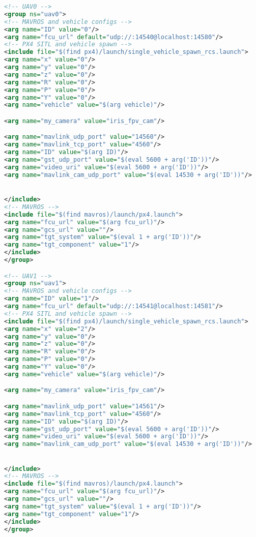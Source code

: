\begin{lstlisting}[language={XML}]
<!-- UAV0 -->
<group ns="uav0">
<!-- MAVROS and vehicle configs -->
<arg name="ID" value="0"/>
<arg name="fcu_url" default="udp://:14540@localhost:14580"/>
<!-- PX4 SITL and vehicle spawn -->
<include file="$(find px4)/launch/single_vehicle_spawn_rcs.launch">
<arg name="x" value="0"/>
<arg name="y" value="0"/>
<arg name="z" value="0"/>
<arg name="R" value="0"/>
<arg name="P" value="0"/>
<arg name="Y" value="0"/>
<arg name="vehicle" value="$(arg vehicle)"/>

<arg name="my_camera" value="iris_fpv_cam"/>

<arg name="mavlink_udp_port" value="14560"/>
<arg name="mavlink_tcp_port" value="4560"/>
<arg name="ID" value="$(arg ID)"/>
<arg name="gst_udp_port" value="$(eval 5600 + arg('ID'))"/>
<arg name="video_uri" value="$(eval 5600 + arg('ID'))"/>
<arg name="mavlink_cam_udp_port" value="$(eval 14530 + arg('ID'))"/>


</include>
<!-- MAVROS -->
<include file="$(find mavros)/launch/px4.launch">
<arg name="fcu_url" value="$(arg fcu_url)"/>
<arg name="gcs_url" value=""/>
<arg name="tgt_system" value="$(eval 1 + arg('ID'))"/>
<arg name="tgt_component" value="1"/>
</include>
</group>

<!-- UAV1 -->
<group ns="uav1">                              
<!-- MAVROS and vehicle configs -->
<arg name="ID" value="1"/>
<arg name="fcu_url" default="udp://:14541@localhost:14581"/>
<!-- PX4 SITL and vehicle spawn -->
<include file="$(find px4)/launch/single_vehicle_spawn_rcs.launch">
<arg name="x" value="2"/>
<arg name="y" value="0"/>
<arg name="z" value="0"/>
<arg name="R" value="0"/>
<arg name="P" value="0"/>
<arg name="Y" value="0"/>
<arg name="vehicle" value="$(arg vehicle)"/>

<arg name="my_camera" value="iris_fpv_cam"/>

<arg name="mavlink_udp_port" value="14561"/>
<arg name="mavlink_tcp_port" value="4560"/>
<arg name="ID" value="$(arg ID)"/>
<arg name="gst_udp_port" value="$(eval 5600 + arg('ID'))"/>
<arg name="video_uri" value="$(eval 5600 + arg('ID'))"/>
<arg name="mavlink_cam_udp_port" value="$(eval 14530 + arg('ID'))"/>


</include>
<!-- MAVROS -->
<include file="$(find mavros)/launch/px4.launch">
<arg name="fcu_url" value="$(arg fcu_url)"/>
<arg name="gcs_url" value=""/>
<arg name="tgt_system" value="$(eval 1 + arg('ID'))"/>
<arg name="tgt_component" value="1"/>
</include>
</group>
\end{lstlisting}

